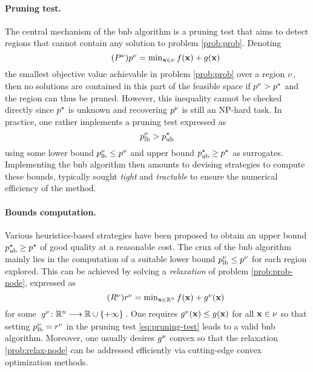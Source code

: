 \documentclass[11pt]{article}
\begin{document}
\paragraph{Pruning test.}
The central mechanism of the \gls{bnb} algorithm is a pruning test that aims to detect regions that cannot contain any solution to problem \eqref{prob:prob}.
Denoting 
\begin{equation}
    \label{prob:prob-node}
    \tag{$\node{\ppb}$}
    \textstyle
    \node{\pobj} = \min_{\pv \in \nodesymbol} \lfunc(\pv) + \rfunc(\pv)
\end{equation}
the smallest objective value achievable in problem \eqref{prob:prob} over a region $\nu$, then no solutions are contained in this part of the feasible space if $p^\nu > p^{\star}$ and the region can thus be pruned.
However, this inequality cannot be checked directly since $p^{\star}$ is unknown and recovering $p^\nu$ is still an NP-hard task.
In practice, one rather implements a pruning test expressed as
\begin{equation}
    \label{eq:pruning-test}
    p_{\text{lb}}^\nu > p_{\text{ub}}^{\star}
\end{equation}
using some lower bound $p_{\text{lb}}^\nu \leq p^\nu$ and upper bound $p_{\text{ub}}^{\star} \geq p^{\star}$ as surrogates.
Implementing the \gls{bnb} algorithm then amounts to devising strategies to compute these bounds, typically sought \emph{tight} and \emph{tractable} to ensure the numerical efficiency of the method.

\paragraph{Bounds computation.}
Various heuristics-based strategies have been proposed to obtain an upper bound $p_{\text{ub}}^{\star} \geq p^{\star}$ of good quality at a reasonable cost.
The crux of the \gls{bnb} algorithm mainly lies in the computation of a suitable lower bound $p_{\text{lb}}^\nu \leq p^\nu$ for each region explored.
This can be achieved by solving a \emph{relaxation} of problem \eqref{prob:prob-node}, expressed as
\begin{equation}
    \label{prob:relax-node}
    \tag{$\node{\rpb}$}
    \textstyle
    \node{\robj} = \min_{\pv \in \kR^{\pdim}} \lfunc(\pv) + \node{\rfunc}(\pv)
\end{equation}
for some $\kfuncdef{\node{\rfunc}}{\kR^{\pdim}}{\kR \cup \{+\infty\}}$.
One requires $g^\nu(\mathbf{x}) \leq g(\mathbf{x})$ for all $\mathbf{x} \in \nu$ so that setting $p_{\text{lb}}^\nu = r^\nu$ in the pruning test \eqref{eq:pruning-test} leads to a valid \gls{bnb} algorithm.
Moreover, one usually desires $g^\nu$ convex so that the relaxation \eqref{prob:relax-node} can be addressed efficiently via cutting-edge convex optimization methods.
\end{document}
